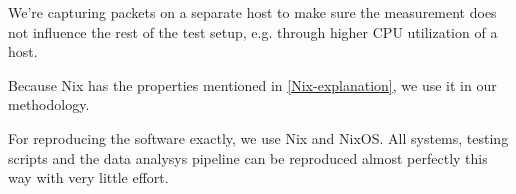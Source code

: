 We're capturing packets on a separate host to make sure the measurement does not influence the rest of the test setup, e.g. through higher CPU utilization of a host.


Because Nix has the properties mentioned in \ref{Nix-explanation}, we use it in our methodology.


For reproducing the software exactly, we use Nix and NixOS.
All systems, testing scripts and the data analysys pipeline can be reproduced almost perfectly this way with very little effort.



\cite{RFC7858}